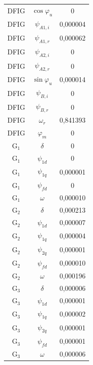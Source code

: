 \begin{longtable}{c c c}
	DFIG & $\cos\varphi_u$ & 0        \\
	DFIG & $\psi_{A1,i}$ & 0,000004 \\
	DFIG & $\psi_{A1,r}$ & 0,000062 \\
	DFIG & $\psi_{A2,i}$ & 0        \\
	DFIG & $\psi_{A2,r}$ & 0        \\
	DFIG & $\sin\varphi_u$ & 0,000014 \\
	DFIG & $\psi_{B,i}$ & 0        \\
	DFIG & $\psi_{B,r}$ & 0        \\
	DFIG & $\omega_r$ & 0,841393 \\
	DFIG & $\varphi_m$ & 0        \\
	G$_1$ & $\delta$ & 0        \\
	G$_1$ & $\psi_{1d}$ & 0        \\
	G$_1$ & $\psi_{1q}$ & 0,000001 \\
	G$_1$ & $\psi_{fd}$ & 0        \\
	G$_1$ & $\omega$ & 0,000010 \\
	G$_2$ & $\delta$ & 0,000213 \\
	G$_2$ & $\psi_{1d}$ & 0,000007 \\
	G$_2$ & $\psi_{1q}$ & 0,000004 \\
	G$_2$ & $\psi_{2q}$ & 0,000001 \\
	G$_2$ & $\psi_{fd}$ & 0,000010 \\
	G$_2$ & $\omega$ & 0,000196 \\
	G$_3$ & $\delta$ & 0,000006 \\
	G$_3$ & $\psi_{1d}$ & 0,000001 \\
	G$_3$ & $\psi_{1q}$ & 0,000002 \\
	G$_3$ & $\psi_{2q}$ & 0,000001 \\
	G$_3$ & $\psi_{fd}$ & 0,000001 \\
	G$_3$ & $\omega$ & 0,000006 \\
\end{longtable}
\par
\endgroup

